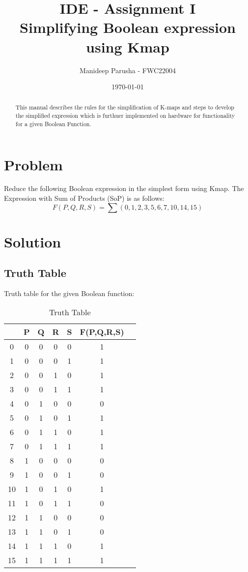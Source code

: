\documentclass[journal,12pt,twocolumn]{IEEEtran}
\title{IDE - Assignment \textrm{I} \textbf{\\Simplifying Boolean expression using Kmap}}
\author{Manideep Parusha - FWC22004}
\date{\today}
\begin{document}
\maketitle

\tableofcontents 
\bigskip
\begin{abstract}
This manual describes the rules for the simplification of K-maps and steps to develop the simplified expression which is furthuer implemented on hardware for functionality for a given Boolean Function. 
\end{abstract}
\section{Problem}
Reduce the following Boolean expression in the simplest form using Kmap. The Expression with Sum of Products (SoP) is as follows:
$$ {F(P,Q,R,S) = \sum (0,1,2,3,5,6,7,10,14,15)}$$

\newpage
\section{Solution}

\subsection{Truth Table}
Truth table for the given Boolean function:
\begin{table}[h]
    \centering
    \begin{tabular}[20pt]{|c|c|c|c|c||c|c|}
          \hline
          &P&Q&R&S&F(P,Q,R,S) \\
          \hline
          0&0&0&0&0&1\\
          1&0&0&0&1&1\\
          2&0&0&1&0&1\\
          3&0&0&1&1&1\\
          4&0&1&0&0&0\\
          5&0&1&0&1&1\\
          6&0&1&1&0&1\\
          7&0&1&1&1&1\\
          8&1&0&0&0&0\\
          9&1&0&0&1&0\\
          10&1&0&1&0&1\\
          11&1&0&1&1&0\\
          12&1&1&0&0&0\\
          13&1&1&0&1&0\\
          14&1&1&1&0&1\\
          15&1&1&1&1&1\\   
          \hline 
              \end{tabular}
              \bigskip
    \caption{Truth Table}
    \label{Truthtable}
\end{table}
\end{document}
